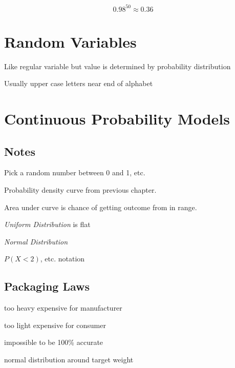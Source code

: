 \documentclass[landscape]{exam}
\begin{document}
  \begin{solution}
    \[
      0.98^{50} \approx 0.36
    \]
  \end{solution}

  \section{Random Variables}
  \begin{itemize*}
    \item Like regular variable but value is determined by probability distribution
    \item Usually upper case letters near end of alphabet
  \end{itemize*}

  \section{Continuous Probability Models}
  \subsection{Notes}
  \begin{itemize*}
    \item Pick a random number between 0 and 1, etc.

    \item Probability density curve from previous chapter. 
  
    \item Area under curve is chance of getting outcome from in range.

    \item {\em Uniform Distribution} is flat

    \item {\em Normal Distribution}

    \item $P(X < 2)$, etc. notation

  \end{itemize*}

  \subsection{Packaging Laws}
  \begin{itemize*}
    \item too heavy expensive for manufacturer
    \item too light expensive for consumer
    \item impossible to be 100\% accurate
    \item normal distribution around target weight
  \end{itemize*}
\end{document}
